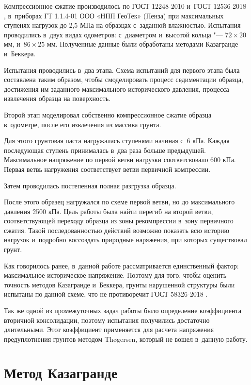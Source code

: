 Компрессионное сжатие производилось по ГОСТ 12248-2010 \cite{gost12248} и~ГОСТ 12536-2018 \cite{gost12536}, в~приборах ГТ 1.1.4-01 ООО «НПП ГеоТек» (Пенза) при максимальных ступенях нагрузок до 2,5 МПа на образцах с~заданной влажностью. Испытания проводились в~двух видах одометров: с~диаметром и~высотой кольца "--- $72 \times 20$ мм, и~$86 \times 25$ мм.
Полученные данные были обработаны методами Казагранде и~Беккера. 

Испытания проводились в~два этапа.
Схема испытаний для первого этапа была составлена таким образом, чтобы смоделировать процесс седиментации образца, достижения им заданного максимального исторического давления, процесса извлечения образца на поверхность.

Второй этап моделировал собственно компрессионное сжатие образца в~одометре, после его извлечения из массива грунта.

Для этого грунтовая паста нагружалась ступенями начиная с~6 кПа.
Каждая последующая ступень принималась в~два раза больше предыдущей.
Максимальное напряжение по первой ветви нагрузки соответсвовало 600 кПа.
Первая ветвь нагружения соответствует ветви первичной компрессии.

Затем проводилась постепенная полная разгрузка образца.

После этого образец нагружался по схеме первой ветви, но до максимального давления 2500 кПа.
Цель работы была найти перегиб на второй ветви, соответствующей переходу образца из зоны рекомпрессии в~зону первичного сжатия.
Такой последованностью действий возможно показать всю историю нагрузок и~подробно воссоздать природные наряжения, при которых существовал грунт. 

Как говорилось ранее, в~данной работе рассматривается единственный фактор: максимальное историческое напряжение.
Поэтому для того, чтобы оценить точность методов Казагранде и~Беккера, грунты нарушенной структуры были испытаны по данной схеме, что не противоречит ГОСТ 58326-2018 \cite{gost58326}.

Так же одной из промежуточных задач работы было определение коэффициента вторичной консолидации, поэтому испытания получились достаточно длительными. Этот коэффициент применяется для расчета напряжения предуплотнения грунтов методом Th{\o}gersen, который не вошел в~данную работу.


\section{Метод Казагранде}

